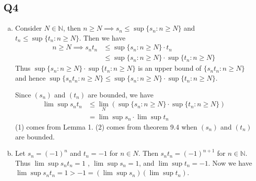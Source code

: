 \documentclass[12pt,lettersize]{article}
\newcommand{\N}{\mathbb{N}}
\begin{document}
	\setcounter{equation}{0}
	\subsection*{Q4}
	\begin{enumerate}[(a)]
		\item Consider $N\in\N$, then $n\geq N \implies s_n \leq \sup\{s_n: n\geq N\}$ and $t_n\leq\sup\{t_n: n\geq N\}$. Then we have
		\begin{align*}
			n\geq N \implies s_nt_n &\leq \sup\{s_n: n\geq N\}\cdot t_n\\
								    &\leq \sup\{s_n: n\geq N\}\cdot\sup\{t_n: n\geq N\}
		\end{align*}
		Thus $\sup\{s_n: n\geq N\}\cdot\sup\{t_n: n\geq N\}$ is an upper bound of $\{s_nt_n: n\geq N\}$ and hence $\sup\{s_nt_n: n\geq N\}\leq\sup\{s_n: n\geq N\}\cdot\sup\{t_n: n\geq N\}$.
		
		Since $(s_n)$ and $(t_n)$ are bounded, we have
		\begin{align}
			\lim\sup s_nt_n &\leq \lim_N(\sup\{s_n: n\geq N\}\cdot\sup\{t_n: n\geq N\})\\
							&= \lim\sup s_n\cdot\lim\sup t_n
		\end{align}
		(1) comes from Lemma 1. (2) comes from theorem 9.4 when $(s_n)$ and $(t_n)$ are bounded.
		\item Let $s_n = (-1)^n$ and $t_n=-1$ for $n\in N$. Then $s_nt_n=(-1)^{n+1}$ for $n\in\N$. Thus $\lim\sup s_nt_n=1$ , $\lim\sup s_n=1$, and $\lim\sup t_n=-1$. Now we have $\lim\sup s_nt_n=1>-1=(\lim\sup s_n)(\lim\sup t_n)$.
	\end{enumerate}
	\newpage
	
\end{document}
